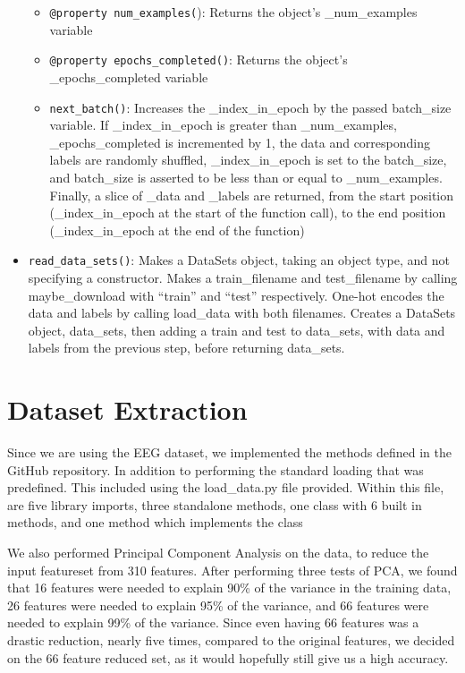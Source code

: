 \documentclass[]{report}
\begin{document}
\begin{itemize}
\begin{itemize}[]
		\item \texttt{@property num\_examples(}): Returns the object’s \_num\_examples variable
		
		\item \texttt{@property epochs\_completed()}: Returns the object’s \_epochs\_completed variable
		
		\item \texttt{next\_batch()}: Increases the \_index\_in\_epoch by the passed batch\_size variable. If \_index\_in\_epoch is greater than \_num\_examples, \_epochs\_completed is incremented by 1, the data and corresponding labels are randomly shuffled, \_index\_in\_epoch is set to the batch\_size, and batch\_size is asserted to be less than or equal to \_num\_examples. Finally, a slice of \_data and \_labels are returned, from the start position (\_index\_in\_epoch at the start of the function call), to the end position (\_index\_in\_epoch at the end of the function) \\
	\end{itemize}
	
	\item \texttt{read\_data\_sets()}: Makes a DataSets object, taking an object type, and not specifying a constructor. Makes a train\_filename and test\_filename by calling maybe\_download with “train” and “test” respectively. One-hot encodes the data and labels by calling load\_data with both filenames. Creates a DataSets object, data\_sets, then adding a train and test to data\_sets, with data and labels from the previous step, before returning data\_sets.
	
\end{itemize}

\section*{Dataset Extraction}

Since we are using the EEG dataset, we implemented the methods defined in the GitHub repository. In addition to performing the standard loading that was predefined. This included using the load\_data.py file provided. Within this file, are five library imports, three standalone methods, one class with 6 built in methods, and one method which implements the class

We also performed Principal Component Analysis on the data, to reduce the input featureset from 310 features. After performing three tests of PCA, we found that 16 features were needed to explain 90\% of the variance in the training data, 26 features were needed to explain 95\% of the variance, and 66 features were needed to explain 99\% of the variance. Since even having 66 features was a drastic reduction, nearly five times, compared to the original features, we decided on the 66 feature reduced set, as it would hopefully still give us a high accuracy.
\end{document}
